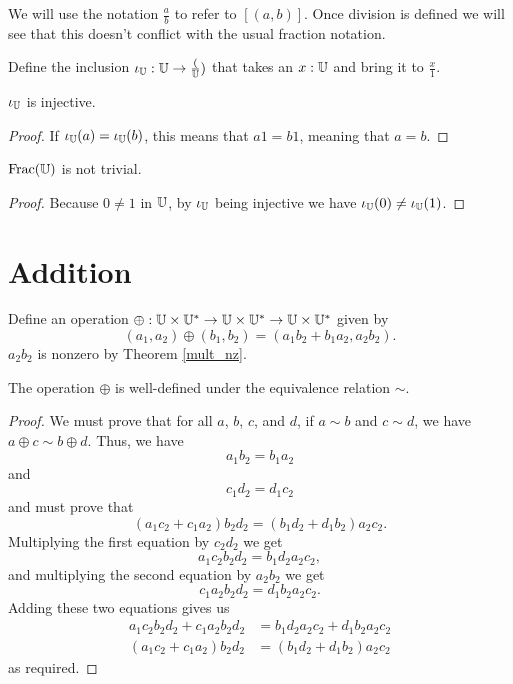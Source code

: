 \documentclass[../../math.tex]{subfiles}
\begin{document}
We will use the notation $\frac{a}{b}$ to refer to $[(a, b)]$.  Once division is
defined we will see that this doesn't conflict with the usual fraction notation.

\begin{definition}
    Define the inclusion $\iota_{\mathbb{U}} : \mathbb{U} \to \frac({\mathbb{U}})$ that takes an $x : \mathbb{U}$
    and bring it to $\frac{x}{1}$.
\end{definition}

\begin{instance}
    $\iota_{\mathbb{U}}$ is injective.
\end{instance}
\begin{proof}
    If $\iota_{\mathbb{U}}(a) = \iota_{\mathbb{U}}(b)$, this means that $a1 = b1$, meaning that $a =
    b$.
\end{proof}

\begin{instance}
    $\operatorname{Frac}(\mathbb{U})$ is not trivial.
\end{instance}
\begin{proof}
    Because $0 \neq 1$ in $\mathbb{U}$, by $\iota_{\mathbb{U}}$ being injective we have
    $\iota_{\mathbb{U}}(0) \neq \iota_{\mathbb{U}}(1)$.
\end{proof}

\section{Addition}

\begin{definition}
    Define an operation $\oplus : \mathbb{U} \times \mathbb{U}^* \to \mathbb{U} \times \mathbb{U}^* \to \mathbb{U}
    \times \mathbb{U}^*$ given by
    \[
        (a_1, a_2) \oplus (b_1, b_2) = (a_1b_2 + b_1a_2, a_2b_2).
    \]
    $a_2b_2$ is nonzero by Theorem \ref{mult_nz}.
\end{definition}

\begin{lemma}
    The operation $\oplus$ is well-defined under the equivalence relation
    $\sim$.
\end{lemma}
\begin{proof}
    We must prove that for all $a$, $b$, $c$, and $d$, if $a \sim b$ and $c \sim
    d$, we have $a \oplus c \sim b \oplus d$.  Thus, we have
    \[
        a_1b_2 = b_1a_2
    \]
    and
    \[
        c_1d_2 = d_1c_2
    \]
    and must prove that
    \[
        (a_1c_2 + c_1a_2)b_2d_2 = (b_1d_2 + d_1b_2)a_2c_2.
    \]
    Multiplying the first equation by $c_2d_2$ we get
    \[
        a_1c_2b_2d_2 = b_1d_2a_2c_2,
    \]
    and multiplying the second equation by $a_2b_2$ we get
    \[
        c_1a_2b_2d_2 = d_1b_2a_2c_2.
    \]
    Adding these two equations gives us
    \begin{align*}
        a_1c_2b_2d_2 + c_1a_2b_2d_2 &= b_1d_2a_2c_2 + d_1b_2a_2c_2 \\
        (a_1c_2 + c_1a_2)b_2d_2 &= (b_1d_2 + d_1b_2)a_2c_2
    \end{align*}
    as required.
\end{proof}
\end{document}
